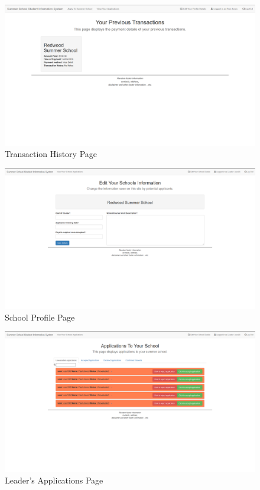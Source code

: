 \documentclass{project}
\begin{document}
\clearpage
\begin{figure}[H]
\includegraphics[width=\linewidth]{transaction-history.png}
\caption{Transaction History Page}
\label{fig:transaction-history}
\end{figure}
\begin{figure}[H]
\includegraphics[width=\linewidth]{leader-profile.png}
\caption{School Profile Page}
\label{fig:school-profile}
\end{figure}
\begin{figure}[H]
\includegraphics[width=\linewidth]{leader-app.png}
\caption{Leader's Applications Page}
\label{fig:leaders-applications}
\end{figure}
\end{document}
